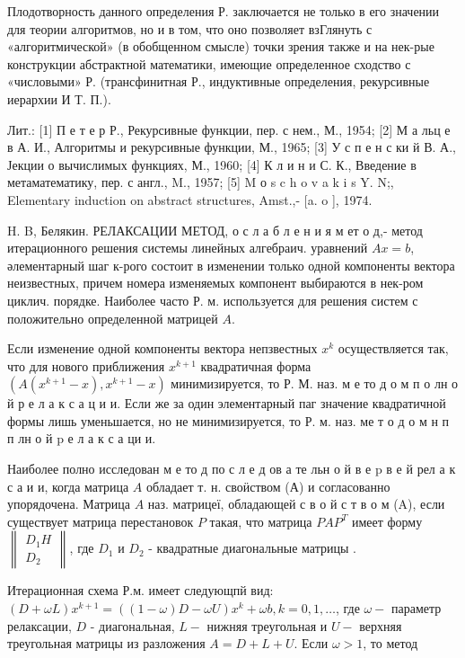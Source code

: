 \documentclass[10pt]{article}
\begin{document}
Плодотворность данного определения Р. заключается не только в его значении для теории алгоритмов, но и в том, что оно позволяет взГлянуть с «алгоритмической» (в обобщенном смысле) точки зрения также и на нек-рые конструкции абстрактной математики, имеющие определенное сходство с «числовыми» Р. (трансфинитная Р., индуктивные определения, рекурсивные иерархии И Т. П.).



Лит.: [1] П е т е р Р., Рекурсивные функции, пер. с нем., М., 1954; [2] М а льц е в А. И., Алгоритмы и рекурсивные функции, М., 1965; [3] У с п е н с ки й В. А., Јекции о вычислимых функциях, М., 1960; [4] К л и н и С. К., Введение в метаматематику, пер. с англ., M., 1957; [5] M о s c h o v a k i s Y. N;, Elementary induction on abstract structures, Amst.,- [a. o ], 1974.



H. B, Белякин. РЕЛАКСАЦИИ МЕТОД, о с л а б л е н и я м ет о д,- метод итерационного решения системы линейных алгебраич. уравнений $A x=b$, әлементарный шаг к-рого состоит в изменении только одной компоненты вектора неизвестных, причем номера изменяемых компонент выбираются в нек-ром циклич. порядке. Наиболее часто Р. м. используется для решения систем с положительно определенной матрицей $A$.



Если изменение одной компоненты вектора непзвестных $x^{k}$ осуществляется так, что для нового приближения $x^{k+1}$ квадратичная форма $\left(A\left(x^{k+1}-x\right), x^{k+1}-x\right)$ минимизируется, то Р. М. наз. м е то д о м п о лн о й р е л а к с а ц и и. Если же за один элементарный паг значение квадратичной формы лишь уменьшается, но не минимизируется, то Р. м. наз. ме т о д о м н п п лн о й $\mathrm{p}$ е л а к с а ци и.



Наиболее полно исследован м е то д по с л е д ов а те льн о й в е $\mathrm{p}$ в е й рел а к с а и и, когда матрица $A$ обладает т. н. своӥством (А) и согласованно упорядочена. Матрица $A$ наз. матрицеї, обладающей с в о й с т в о м (A), если существует матрица перестановок $P$ такая, что матрица $P A P^{T}$ имеет форму $\left\|\begin{array}{c}D_{1} H \\ D_{2}\end{array}\right\|$, где $D_{1}$ и $D_{2}$ - квадратные диагональные матрицы .



Итерационная схема Р.м. имеет следующпй вид: $(D+\omega L) x^{k+1}=((1-\omega) D-\omega U) x^{k}+\omega b, k=0,1, \ldots$, где $\omega-$ параметр релаксации, $D$ - диагональная, $L-$ нижняя треугольная и $U-$ верхняя треугольная матрицы из разложения $A=D+L+U$. Если $\omega>1$, то метод
\end{document}
